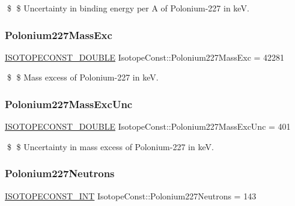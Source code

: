 \$ \$ Uncertainty in binding energy per A of Polonium-\/227 in keV. \mbox{\label{group___isotope_const-_polonium-_po227_gad9b3dd0f64051aaaa3c6b09e61564ab2}} 
\subsubsection{\texorpdfstring{Polonium227\+Mass\+Exc}{Polonium227MassExc}}
{\footnotesize\ttfamily \mbox{\hyperlink{group___isotope_const-_macros_ga8f45a7272ce02c0b4c65c44636ed719a}{I\+S\+O\+T\+O\+P\+E\+C\+O\+N\+S\+T\+\_\+\+D\+O\+U\+B\+LE}} Isotope\+Const\+::\+Polonium227\+Mass\+Exc = 42281}

\$ \$ Mass excess of Polonium-\/227 in keV. \mbox{\label{group___isotope_const-_polonium-_po227_ga30daaac9501cd42840ae8c02ab43d36a}} 
\subsubsection{\texorpdfstring{Polonium227\+Mass\+Exc\+Unc}{Polonium227MassExcUnc}}
{\footnotesize\ttfamily \mbox{\hyperlink{group___isotope_const-_macros_ga8f45a7272ce02c0b4c65c44636ed719a}{I\+S\+O\+T\+O\+P\+E\+C\+O\+N\+S\+T\+\_\+\+D\+O\+U\+B\+LE}} Isotope\+Const\+::\+Polonium227\+Mass\+Exc\+Unc = 401}

\$ \$ Uncertainty in mass excess of Polonium-\/227 in keV. \mbox{\label{group___isotope_const-_polonium-_po227_ga0c8f30cb009f76c11064ecdaa5fd1ff6}} 
\subsubsection{\texorpdfstring{Polonium227\+Neutrons}{Polonium227Neutrons}}
{\footnotesize\ttfamily \mbox{\hyperlink{group___isotope_const-_macros_ga5f18360b3e99483a35c32d789e62621c}{I\+S\+O\+T\+O\+P\+E\+C\+O\+N\+S\+T\+\_\+\+I\+NT}} Isotope\+Const\+::\+Polonium227\+Neutrons = 143}

